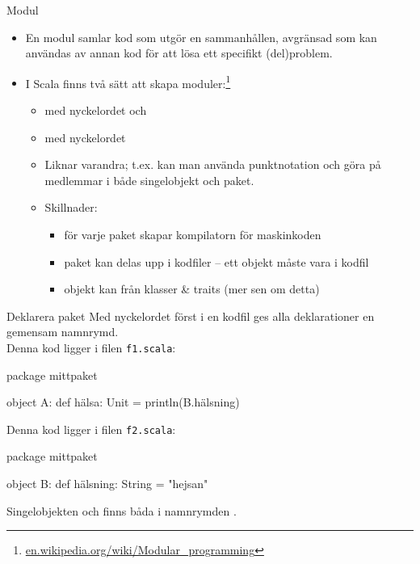 \begin{Slide}{Modul}

  \begin{itemize}
    \item En modul samlar kod som utgör en sammanhållen, avgränsad  som kan användas av annan kod  för att lösa ett specifikt (del)problem.
    \item I Scala finns två sätt att skapa moduler:\footnote{\href{https://en.wikipedia.org/wiki/Modular_programming}{en.wikipedia.org/wiki/Modular\_programming}}
    \begin{itemize}\SlideFontTiny
      \item {} med nyckelordet  och
      \item {} med nyckelordet 
      \pause
      \item Liknar varandra; t.ex. kan man använda punktnotation och göra  på medlemmar i både singelobjekt och paket.
      \pause
      \item Skillnader:
      \begin{itemize} \SlideFontTiny
        \item för varje paket skapar kompilatorn  för maskinkoden 
        \item paket kan delas upp i  kodfiler -- ett objekt måste vara i  kodfil
        \item objekt kan  från klasser \& traits (mer sen om detta)
      \end{itemize}
    \end{itemize}
  
  \end{itemize}
\end{Slide}

\begin{Slide}{Deklarera paket}
Med nyckelordet  först i en kodfil ges alla deklarationer en gemensam namnrymd.\\
\vspace{1em}
Denna kod ligger i filen \texttt{f1.scala}:
\begin{Code}
package mittpaket

object A: 
  def hälsa: Unit = println(B.hälsning)
\end{Code}

Denna kod ligger i filen \texttt{f2.scala}:
\begin{Code}
package mittpaket

object B:
  def hälsning: String = "hejsan"
\end{Code}
Singelobjekten  och  finns båda i namnrymden .
\end{Slide}

